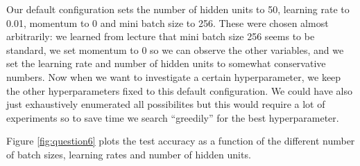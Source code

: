 \documentclass[paper=a4, fontsize=11pt]{scrartcl}
\begin{document}
Our default configuration sets the number of hidden units to 50, learning rate to 0.01, momentum to 0 and mini batch size to 256. These were chosen almost arbitrarily: we learned from lecture that mini batch size 256 seems to be standard, we set momentum to 0 so we can observe the other variables, and we set the learning rate and number of hidden units to somewhat conservative numbers.  Now when we want to investigate a certain hyperparameter, we keep the other hyperparameters fixed to this default configuration.  We could have also just exhaustively enumerated all possibilites but this would require a lot of experiments so to save time we search ``greedily'' for the best hyperparameter.

Figure \ref{fig:question6} plots the test accuracy as a function of the different number of batch sizes, learning rates and number of hidden units.
\end{document}
